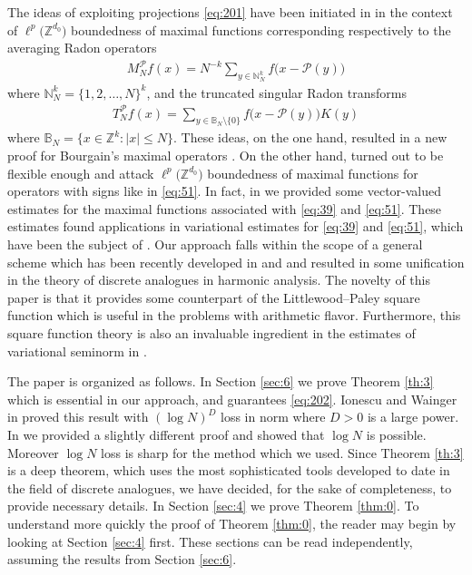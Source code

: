\documentclass[a4paper,oneside]{amsart}
\theoremstyle{plain}
\theoremstyle{definition}
\numberwithin{equation}{section}
\newcounter{thm}
\theoremstyle{plain}
\newcommand{\ZZ}{\mathbb{Z}}
\newcommand{\NN}{\mathbb{N}}
\newcommand{\calP}{\mathcal{P}}
\newcommand{\8}{\infty}
\begin{document}
The ideas of exploiting projections \eqref{eq:201} have been initiated
in \cite{mst1} in the context of  $\ell^p\big(\ZZ^{d_0}\big)$
boundedness of maximal functions corresponding respectively to the averaging
Radon operators
\begin{align}
\label{eq:39}
	 M_N^{\calP} f(x)
	=N^{-k} \sum_{y\in\NN_N^k}
	f\big(x-\calP(y)\big)
\end{align}
where $\NN^k_N = \{1, 2, \ldots, N\}^k$, and the truncated singular
Radon transforms
\begin{align}
  \label{eq:51}
T_N^{\calP} f(x)
=
\sum_{y\in\mathbb B_N\setminus\{0\}} f\big(x - \calP(y)\big) K(y)  
\end{align}
where $\mathbb B_N=\{x\in\ZZ^k: |x|\le N\}$. These ideas, on the one
hand, resulted in a new proof for Bourgain's maximal operators
\cite{bou1, bou2, bou}. On the other hand, turned out to be flexible
enough and attack $\ell^p\big(\ZZ^{d_0}\big)$ boundedness of maximal
functions for operators with signs like in \eqref{eq:51}. In fact, in
\cite{mst1} we provided some vector-valued estimates for the maximal
functions associated with \eqref{eq:39} and \eqref{eq:51}. These
estimates found applications in variational estimates for
\eqref{eq:39} and \eqref{eq:51}, which have been the subject of
\cite{mst2}.  Our approach falls within the scope of a general scheme
which has been recently developed in \cite{mst1} and \cite{mst2} and
resulted in some unification in the theory of discrete analogues in
harmonic analysis. The novelty of this paper is that it provides some
counterpart of the Littlewood--Paley square function which is useful
in the problems with arithmetic flavor. Furthermore, this square
function theory  is also an invaluable ingredient in the
estimates of variational seminorm in \cite{mst2}.

The paper is organized as follows.  In Section \ref{sec:6} we prove
Theorem \ref{th:3} which is essential in our approach, and guarantees
\eqref{eq:202}.  Ionescu and Wainger in \cite{iw} proved this result
with $(\log N)^D$ loss in norm where $D>0$ is a large power.  In \cite{mst1}
we provided a slightly different proof and showed that $\log N$ is
possible. Moreover $\log N$ loss is sharp for the method which we
used.  Since Theorem \ref{th:3} is a deep theorem, which uses the most
sophisticated tools developed to date in the field of discrete
analogues, we have decided, for the sake of
completeness, to provide necessary details.  In Section \ref{sec:4} we
prove Theorem \ref{thm:0}. To understand more quickly the proof of
Theorem \ref{thm:0}, the reader may begin by looking at Section
\ref{sec:4} first. These sections can be read independently, assuming
the results from Section \ref{sec:6}.
\end{document}
